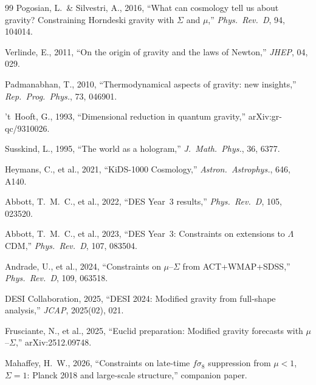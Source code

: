 \documentclass[11pt]{article}
\begin{document}
\begin{thebibliography}{99}
Pogosian, L.\ \& Silvestri, A., 2016, ``What can cosmology tell us about
gravity? Constraining Horndeski gravity with $\Sigma$ and $\mu$,''
\textit{Phys.\ Rev.\ D}, 94, 104014.

Verlinde, E., 2011, ``On the origin of gravity and the laws of Newton,''
\textit{JHEP}, 04, 029.

Padmanabhan, T., 2010, ``Thermodynamical aspects of gravity: new insights,''
\textit{Rep.\ Prog.\ Phys.}, 73, 046901.

't~Hooft, G., 1993, ``Dimensional reduction in quantum gravity,''
arXiv:gr-qc/9310026.

Susskind, L., 1995, ``The world as a hologram,'' \textit{J.\ Math.\ Phys.},
36, 6377.

Heymans, C., et al., 2021, ``KiDS-1000 Cosmology,'' \textit{Astron.\
Astrophys.}, 646, A140.

Abbott, T.~M.~C., et al., 2022, ``DES Year~3 results,'' \textit{Phys.\
Rev.\ D}, 105, 023520.

Abbott, T.~M.~C., et al., 2023, ``DES Year~3: Constraints on extensions to
$\Lambda$CDM,'' \textit{Phys.\ Rev.\ D}, 107, 083504.

Andrade, U., et al., 2024, ``Constraints on $\mu$--$\Sigma$ from
ACT+WMAP+SDSS,'' \textit{Phys.\ Rev.\ D}, 109, 063518.

DESI Collaboration, 2025, ``DESI 2024: Modified gravity from full-shape
analysis,'' \textit{JCAP}, 2025(02), 021.

Frusciante, N., et al., 2025, ``Euclid preparation: Modified gravity forecasts
with $\mu$--$\Sigma$,'' arXiv:2512.09748.

Mahaffey, H.~W., 2026, ``Constraints on late-time $f\sigma_8$ suppression from
$\mu < 1$, $\Sigma = 1$: Planck 2018 and large-scale structure,''
companion paper.

\end{thebibliography}
\end{document}

